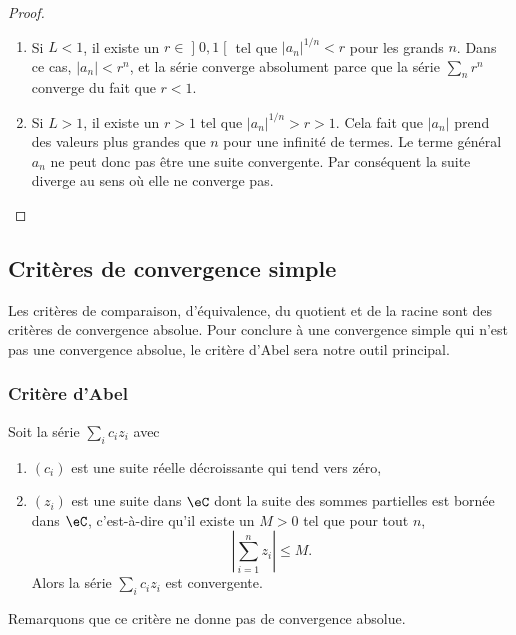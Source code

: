 \begin{proof}
    \begin{enumerate}
        \item
            Si $L<1$, il existe un $r\in \mathopen] 0 , 1 \mathclose[$ tel que $| a_n |^{1/n}<r$ pour les grands $n$. Dans ce cas, $| a_n |<r^{n}$, et la série converge absolument parce que la série $\sum_nr^n$ converge du fait que $r<1$.
        \item
            Si $L>1$, il existe un $r>1$ tel que $| a_n |^{1/n}>r>1$. Cela fait que $| a_n |$ prend des valeurs plus grandes que $n$ pour une infinité de termes. Le terme général $a_n$ ne peut donc pas être une suite convergente. Par conséquent la suite diverge au sens où elle ne converge pas.

    \end{enumerate}
\end{proof}

\subsection{Critères de convergence simple}

Les critères de comparaison, d'équivalence, du quotient et de la racine sont des critères de convergence absolue. Pour conclure à une convergence simple qui n'est pas une convergence absolue, le critère d'Abel sera notre outil principal.

\subsubsection{Critère d'Abel}

\begin{proposition}
    Soit la série $\sum_i c_iz_i$ avec
    \begin{enumerate}
        \item $(c_i)$ est une suite réelle décroissante qui tend vers zéro,
        \item $(z_i)$ est une suite dans $\eC$ dont la suite des sommes partielles est bornée dans $\eC$, c'est-à-dire qu'il existe un $M>0$ tel que pour tout $n$,
        \begin{equation}
            \left| \sum_{i=1}^nz_i \right| \leq M.
        \end{equation}
        Alors la série $\sum_ic_iz_i$ est convergente.
    \end{enumerate}
\end{proposition}
Remarquons que ce critère ne donne pas de convergence absolue.

